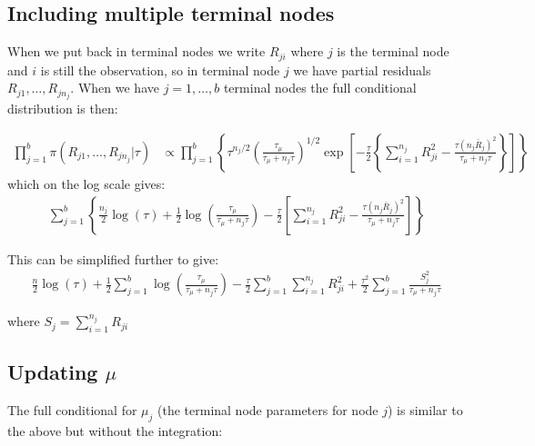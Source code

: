 \documentclass{article}
\begin{document}
\subsection*{Including multiple terminal nodes}

When we put back in terminal nodes we write $R_{ji}$ where $j$ is the terminal node and $i$ is still the observation, so in terminal node $j$ we have partial residuals $R_{j1}, \ldots, R_{jn_j}$. When we have $j=1,\ldots,b$ terminal nodes the full conditional distribution is then:

\begin{align*}
\prod_{j=1}^b \pi(R_{j1}, \ldots, R_{jn_j} | \tau) &\propto \prod_{j=1}^b \left\{ \tau^{n_j/2} \left( \frac{\tau_\mu}{\tau_\mu + n_j \tau} \right)^{1/2} \exp \left[ -\frac{\tau}{2} \left\{ \sum_{i=1}^{n_j} R_{ji}^2 - \frac{ \tau (n_j \bar{R}_j)^2 }{ \tau_\mu + n_j \tau } \right\} \right] \right\}
\end{align*}
which on the log scale gives:
\begin{align*}
\sum_{j=1}^b \left\{ \frac{n_j}{2} \log(\tau) + \frac{1}{2} \log \left( \frac{\tau_\mu}{\tau_\mu + n_j \tau} \right) - \frac{\tau}{2} \left[ \sum_{i=1}^{n_j} R_{ji}^2 - \frac{ \tau (n_j \bar{R}_j)^2 }{ \tau_\mu + n_j \tau } \right] \right\}
\end{align*}

This can be simplified further to give:
\begin{align*}
\frac{n}{2} \log(\tau) + \frac{1}{2} \sum_{j=1}^b \log \left( \frac{\tau_\mu}{\tau_\mu + n_j \tau} \right) - \frac{\tau}{2} \sum_{j=1}^b 
\sum_{i=1}^{n_j} R_{ji}^2 + \frac{\tau^2}{2} \sum_{j=1}^b \frac{ S_j^2 }{ \tau_\mu + n_j \tau }
\end{align*}

where $S_j = \sum_{i=1}^{n_j} R_{ji}$


\subsection*{Updating $\mu$}

The full conditional for $\mu_{j}$ (the terminal node parameters for node $j$) is similar to the above but without the integration:
\end{document}
